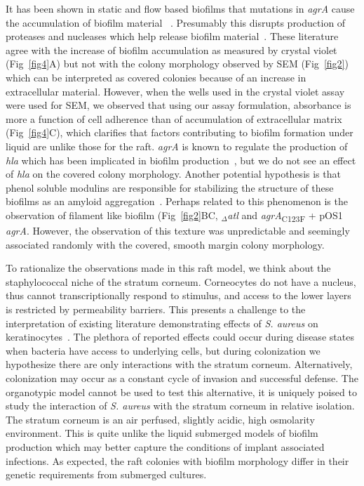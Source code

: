 \documentclass[10pt,letterpaper]{article}
\begin{document}
It has been shown in static and flow based biofilms that mutations in \textit{agrA} cause the accumulation of biofilm material ~\cite{periasamy_how_2012}.
Presumably this disrupts production of proteases and nucleases which help release biofilm material~\cite{boles_agr-mediated_2008, kiedrowski_nuclease_2011}.
These literature agree with the increase of biofilm accumulation as measured by crystal violet (Fig~\ref{fig4}A) but not with the colony morphology observed by SEM (Fig~\ref{fig2}) which can be interpreted as covered colonies because of an increase in extracellular material.
However, when the wells used in the crystal violet assay were used for SEM, we observed that using our assay formulation, absorbance is more a function of cell adherence than of accumulation of extracellular matrix (Fig~\ref{fig4}C), which clarifies that factors contributing to biofilm formation under liquid are unlike those for the raft.
\textit{agrA} is known to regulate the production of \textit{hla} which has been implicated in biofilm production~\cite{caiazza_alpha-toxin_2003}, but we do not see an effect of \textit{hla} on the covered colony morphology.
Another potential hypothesis is that phenol soluble modulins are responsible for stabilizing the structure of these biofilms as an amyloid aggregation~\cite{schwartz_functional_2012}.
Perhaps related to this phenomenon is the observation of filament like biofilm (Fig~\ref{fig2}BC, $_\Delta$\textit{atl} and \textit{agrA}\textsubscript{C123F} + pOS1 \textit{agrA}.
However, the observation of this texture was unpredictable and seemingly associated randomly with the covered, smooth margin colony morphology.

To rationalize the observations made in this raft model, we think about the staphylococcal niche of the stratum corneum.
Corneocytes do not have a nucleus, thus cannot transcriptionally respond to stimulus, and access to the lower layers is restricted by permeability barriers.
This presents a challenge to the interpretation of existing literature demonstrating effects of \textit{S. aureus} on keratinocytes~\cite{mempel_invasion_2002, menzies_signal_2006, secor_staphylococcus_2011, soong_methicillin-resistant_2015, haugwitz_pore-forming_2006}.
The plethora of reported effects could occur during disease states when bacteria have access to underlying cells, but during colonization we hypothesize there are only interactions with the stratum corneum.
Alternatively, colonization may occur as a constant cycle of invasion and successful defense.
The organotypic model cannot be used to test this alternative, it is uniquely poised to study the interaction of \textit{S. aureus} with the stratum corneum in relative isolation.
The stratum corneum is an air perfused, slightly acidic, high osmolarity environment.
This is quite unlike the liquid submerged models of biofilm production which may better capture the conditions of implant associated infections.
As expected, the raft colonies with biofilm morphology differ in their genetic requirements from submerged cultures.
\end{document}
